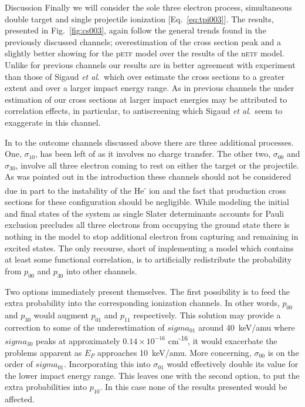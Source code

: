 \documentclass[aps, pra, reprint, groupedaddress, amsfonts,
               amsmath, amssymb, showpacs, nofootinbib]{revtex4-1}
\begin{document}
\begin{section}{Discussion \label{sec:disc}}
   Finally we will consider the sole three electron process, simultaneous double target and single
   projectile ionization [Eq.~\eqref{eq:tpi003}]. The results, presented in Fig.~\ref{fig:cs003}, again
   follow the general trends found in the previously discussed channels; overestimation of the cross
   section peak and a slightly better showing for the p\textsc{etf} model over the results of the
   n\textsc{etf} model. Unlike for previous channels our results are in better agreement with experiment
   than those of Sigaud \textit{et al}.\ which over estimate the cross sections to a greater extent and
   over a larger impact energy range. As in previous channels the under estimation of our cross sections
   at larger impact energies may be attributed to correlation effects, in particular, to antiscreening
   which  Sigaud \textit{et al}.\ seem to exaggerate in this channel.

   In to the outcome channels discussed above there are three additional processes. One, $\sigma_{10}$,
   has been left of as it involves no charge transfer. The other two, $\sigma_{00}$ and $\sigma_{30}$,
   involve all three electron coming to rest on either the target or the projectile. As was pointed out
   in the introduction these channels should not be considered due in part to the instability of the
   He\textsuperscript{-} ion and the fact that production cross sections for these configuration should
   be negligible. While modeling the initial and final states of the system as single Slater determinants
   accounts for Pauli exclusion precludes all three electrons from occupying the ground state there is
   nothing in the model to stop additional electron from capturing and remaining in excited states. The
   only recourse, short of implementing a model which contains at least some functional correlation, is
   to artificially redistribute the probability from $p_{00}$ and $p_{30}$ into other channels.

   Two options immediately present themselves. The first possibility is to feed the extra probability
   into the corresponding ionization channels. In other words, $p_{00}$ and $p_{30}$ would augment
   $p_{01}$ and $p_{11}$ respectively. This solution may provide a correction to some of the
   underestimation of $sigma_{01}$ around 40~keV/amu where $sigma_{30}$ peaks at approximately
   $0.14 \times 10^{-16}$ cm\textsuperscript{-16}, it would exacerbate the problems apparent as $E_P$
   approaches 10~keV/amu. More concerning, $\sigma_{00}$ is on the order of $sigma_{01}$. Incorporating
   this into $\sigma_{01}$ would effectively double its value for the lower impact energy range. This
   leaves one with the second option, to put the extra probabilities into $p_{10}$. In this case none
   of the results presented would be affected.


\end{section}
\end{document}
